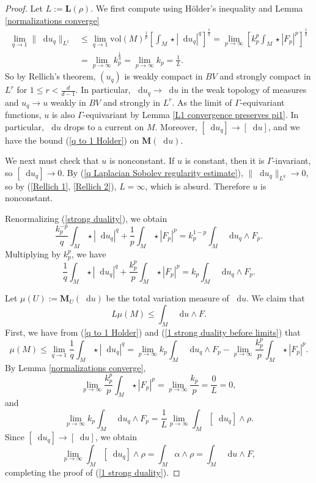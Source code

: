 \documentclass[reqno,11pt]{amsart}
\newcommand*\dif{\mathop{}\!\mathrm{d}}
\newcommand{\vol}{\mathrm{vol}}
\newcommand{\Mass}{\mathbf M}
\newcommand{\Comass}{\mathbf L}
\theoremstyle{definition}
\numberwithin{equation}{section}
\begin{document}
\begin{proof}
Let $L := \Comass(\rho)$.
We first compute using H\"older's inequality and Lemma \ref{normalizations converge}
\begin{align}
\lim_{q \to 1} \|\dif u_q\|_{L^1}
&\leq \lim_{q \to 1} \vol(M)^{\frac{1}{p}} \left[\int_M \star |\dif u_q|^q\right]^{\frac{1}{q}} = \lim_{p \to \infty} \left[k_p^p \int_M \star |F_p|^p\right]^{\frac{1}{q}} \label{Rellich 1}\\
&= \lim_{p \to \infty} k_p^{\frac{1}{q}} = \lim_{p \to \infty} k_p = \frac{1}{L} \label{Rellich 2}.
\end{align}
So by Rellich's theorem, $(u_q)$ is weakly compact in $BV$ and strongly compact in $L^r$ for $1 \leq r < \frac{d}{d - 1}$.
In particular, $\dif u_q \to \dif u$ in the weak topology of measures and $u_q \to u$ weakly in $BV$ and strongly in $L^r$.
As the limit of $\Gamma$-equivariant functions, $u$ is also $\Gamma$-equivariant by Lemma \ref{L1 convergence preserves pi1}.
In particular, $\dif u$ drops to a current on $M$.
Moreover, $[\dif u_q] \to [\dif u]$, and we have the bound (\ref{q to 1 Holder}) on $\Mass(\dif u)$.

We next must check that $u$ is nonconstant.
If $u$ is constant, then it is $\Gamma$-invariant, so $[\dif u_q] \to 0$.
By (\ref{q Laplacian Sobolev regularity estimate}), $\|\dif u_q\|_{L^q} \to 0$, so by (\ref{Rellich 1}, \ref{Rellich 2}), $L = \infty$, which is absurd.
Therefore $u$ is nonconstant.

Renormalizing (\ref{strong duality}), we obtain 
$$\frac{k_p^{-p}}{q} \int_M \star |\dif u_q|^q + \frac{1}{p} \int_M \star |F_p|^p = k_p^{1 - p} \int_M \dif u_q \wedge F_p.$$
Multiplying by $k_p^p$, we have 
\begin{equation}\label{1 strong duality before limits}
	\frac{1}{q} \int_M \star |\dif u_q|^q + \frac{k_p^p}{p} \int_M \star |F_p|^p = k_p \int_M \dif u_q \wedge F_p.
\end{equation}

Let $\mu(U) := \Mass_U(\dif u)$ be the total variation measure of $\dif u$.
We claim that
\begin{equation}\label{1 strong duality}
	L\mu(M) \leq \int_M \dif u \wedge F.
\end{equation}
First, we have from (\ref{q to 1 Holder}) and (\ref{1 strong duality before limits}) that
$$\mu(M) \leq \lim_{q \to 1} \frac{1}{q} \int_M \star |\dif u_q|^q = \lim_{p \to \infty} k_p \int_M \dif u_q \wedge F_p - \lim_{p \to \infty} \frac{k_p^p}{p} \int_M \star |F_p|^p.$$
By Lemma \ref{normalizations converge},
$$\lim_{p \to \infty} \frac{k_p^p}{p} \int_M \star |F_p|^p = \lim_{p \to \infty} \frac{k_p}{p} = \frac{0}{L} = 0,$$
and
$$\lim_{p \to \infty} k_p \int_M \dif u_q \wedge F_p = \frac{1}{L} \lim_{p \to \infty} \int_M [\dif u_q] \wedge \rho.$$
Since $[\dif u_q] \to [\dif u]$, we obtain
$$\lim_{p \to \infty} \int_M [\dif u_q] \wedge \rho = \int_M \alpha \wedge \rho = \int_M \dif u \wedge F,$$
completing the proof of (\ref{1 strong duality}).


\end{proof}
\end{document}
